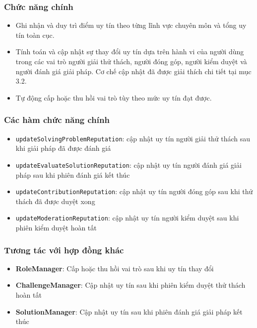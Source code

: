 \subsubsection{Chức năng chính}

\begin{itemize}
  \item Ghi nhận và duy trì điểm uy tín theo từng lĩnh vực chuyên môn và tổng uy tín toàn cục.
  \item Tính toán và cập nhật sự thay đổi uy tín dựa trên hành vi của người dùng trong các vai trò người giải thử thách, người đóng góp, người kiểm duyệt và người đánh giá giải pháp. Cơ chế cập nhật đã được giải thích chi tiết tại mục 3.2.
  \item Tự động cấp hoặc thu hồi vai trò tùy theo mức uy tín đạt được.
\end{itemize}

\subsubsection{Các hàm chức năng chính}

\begin{itemize}
  \item \texttt{updateSolvingProblemReputation}: cập nhật uy tín người giải thử thách sau khi giải pháp đã được đánh giá
  \item \texttt{updateEvaluateSolutionReputation}: cập nhật uy tín người đánh giá giải pháp sau khi phiên đánh giá kết thúc
  \item \texttt{updateContributionReputation}: cập nhật uy tín người đóng góp sau khi thử thách đã được duyệt xong
  \item \texttt{updateModerationReputation}: cập nhật uy tín người kiểm duyệt sau khi phiên kiểm duyệt hoàn tất
\end{itemize}

\subsubsection{Tương tác với hợp đồng khác}

\begin{itemize}
  \item \textbf{RoleManager}: Cấp hoặc thu hồi vai trò sau khi uy tín thay đổi
  \item \textbf{ChallengeManager}: Cập nhật uy tín sau khi phiên kiểm duyệt thử thách hoàn tất
  \item \textbf{SolutionManager}: Cập nhật uy tín sau khi phiên đánh giá giải pháp kết thúc
\end{itemize}

